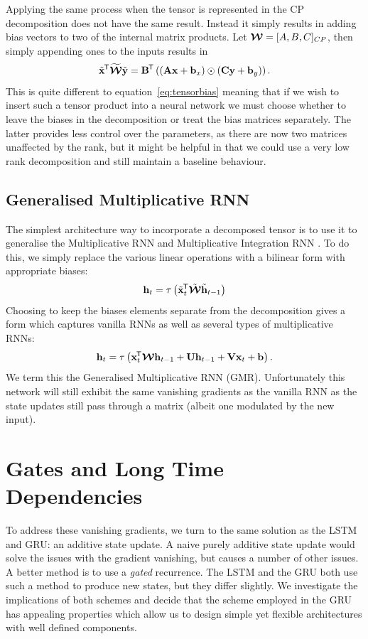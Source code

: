Applying the same process when the tensor is represented in the CP decomposition does not
have the same result. Instead it simply results in adding bias vectors to two of the internal
matrix products. Let \(\bm{\mathcal{W}} = [A, B, C]_{CP}\), then simply appending ones to the inputs
results in
\begin{equation}
	\tilde{\mathbf{x}}^{\mkern-1.5mu\mathsf{T}}\widetilde{\bm{\mathcal{W}}}\tilde{\mathbf{y}}
	= \mathbf{B}^{\mkern-1.5mu\mathsf{T}}\left( (\mathbf{A}\mathbf{x} + \mathbf{b}_x) \odot (\mathbf{C}\mathbf{y} + \mathbf{b}_y)\right).
\end{equation} This is quite different to equation~\eqref{eq:tensorbias} meaning that if we wish to
insert such a tensor product into a neural network we must choose whether to leave the biases in
the decomposition or treat the bias matrices separately. The latter provides less control over the
parameters, as there are now two matrices unaffected by the rank, but it might be helpful in that we
could use a very low rank decomposition and still maintain a baseline behaviour.

\subsection{Generalised Multiplicative RNN}\label{sec:gmrnn}
The simplest architecture way to incorporate a decomposed tensor is to use it to generalise the
Multiplicative RNN and Multiplicative Integration RNN \autocite{Martens2011a, Wu2016}.
To do this, we simply replace the various linear operations with a bilinear form with appropriate
biases:
\begin{equation}\label{eq:gmrnn}
	\mathbf{h}_t = \tau\left( \tilde{\mathbf{x}}_t^{\mkern-1.5mu\mathsf{T}}\tilde{\bm{\mathcal{W}}}\tilde{\mathbf{h}}_{t-1} \right)
\end{equation}
Choosing to keep the biases elements separate from the decomposition gives a form which captures
vanilla RNNs as well as several types of multiplicative RNNs:
\begin{equation}\label{eq:gmrnnbias}
	\mathbf{h}_t = \tau\left(\mathbf{x}_t^{\mkern-1.5mu\mathsf{T}}\bm{\mathcal{W}}\mathbf{h}_{t-1}
		+ \mathbf{U}\mathbf{h}_{t-1} + \mathbf{V}\mathbf{x}_t + \mathbf{b}\right).
\end{equation} We term this the Generalised Multiplicative RNN (GMR). Unfortunately this
network will still exhibit the same vanishing gradients as the vanilla RNN as the state updates
still pass through a matrix (albeit one modulated by the new input).

\section{Gates and Long Time Dependencies}
To address these vanishing gradients, we turn to the same solution as the LSTM and GRU: an additive state
update. A naive purely additive state update would solve the issues with the gradient vanishing, but
causes a number of other issues. A better method is to use a \emph{gated} recurrence. The LSTM and
the GRU both use such a method to produce new states, but they differ slightly. We investigate
the implications of both schemes and decide that the scheme employed in the GRU has appealing 
properties which allow us to design simple yet flexible architectures with well defined components.

